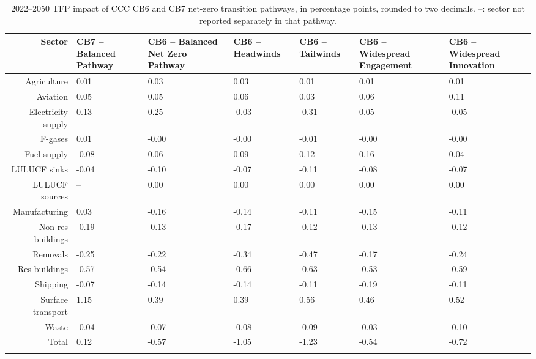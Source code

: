 \begin{longtable}{rP{2cm}P{2cm}P{2cm}P{2cm}P{2cm}P{2cm}}
\caption{2022--2050 TFP impact of CCC CB6 and CB7 net-zero transition pathways, in percentage points, rounded to two decimals. --: sector not reported separately in that pathway.} \\ 
  \hline
Sector & CB7 – Balanced Pathway & CB6 – Balanced Net Zero Pathway & CB6 – Headwinds & CB6 – Tailwinds & CB6 – Widespread Engagement & CB6 – Widespread Innovation \\ 
  \hline
Agriculture & 0.01 & 0.03 & 0.03 & 0.01 & 0.01 & 0.01 \\ 
  Aviation & 0.05 & 0.05 & 0.06 & 0.03 & 0.06 & 0.11 \\ 
  Electricity supply & 0.13 & 0.25 & -0.03 & -0.31 & 0.05 & -0.05 \\ 
  F-gases & 0.01 & -0.00 & -0.00 & -0.01 & -0.00 & -0.00 \\ 
  Fuel supply & -0.08 & 0.06 & 0.09 & 0.12 & 0.16 & 0.04 \\ 
  LULUCF sinks & -0.04 & -0.10 & -0.07 & -0.11 & -0.08 & -0.07 \\ 
  LULUCF sources & -- & 0.00 & 0.00 & 0.00 & 0.00 & 0.00 \\ 
  Manufacturing & 0.03 & -0.16 & -0.14 & -0.11 & -0.15 & -0.11 \\ 
  Non res buildings & -0.19 & -0.13 & -0.17 & -0.12 & -0.13 & -0.12 \\ 
  Removals & -0.25 & -0.22 & -0.34 & -0.47 & -0.17 & -0.24 \\ 
  Res buildings & -0.57 & -0.54 & -0.66 & -0.63 & -0.53 & -0.59 \\ 
  Shipping & -0.07 & -0.14 & -0.14 & -0.11 & -0.19 & -0.11 \\ 
  Surface transport & 1.15 & 0.39 & 0.39 & 0.56 & 0.46 & 0.52 \\ 
  Waste & -0.04 & -0.07 & -0.08 & -0.09 & -0.03 & -0.10 \\ 
   \hline
Total & 0.12 & -0.57 & -1.05 & -1.23 & -0.54 & -0.72 \\ 
  \hline
\label{tab_CCC_CB6_CB7_TFP_opex_capex}
\end{longtable}

